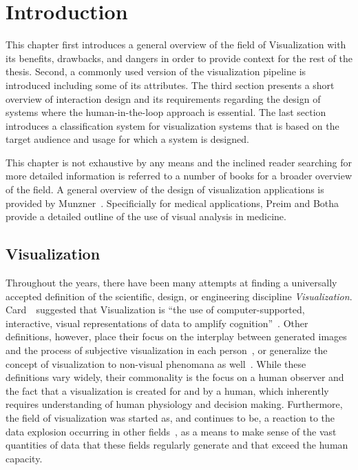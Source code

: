 \chapter{Introduction} \label{cha:intro}
This chapter first introduces a general overview of the field of Visualization with its benefits, drawbacks, and dangers in order to provide context for the rest of the thesis.  Second, a commonly used version of the visualization pipeline is introduced including some of its attributes.  The third section presents a short overview of interaction design and its requirements regarding the design of systems where the human-in-the-loop approach is essential.  The last section introduces a classification system for visualization systems that is based on the target audience and usage for which a system is designed.

This chapter is not exhaustive by any means and the inclined reader searching for more detailed information is referred to a number of books for a broader overview of the field.  A general overview of the design of visualization applications is provided by Munzner~\cite{munzner2014visualization}.  Specificially for medical applications, Preim and Botha~\cite{preim2013visual} provide a detailed outline of the use of visual analysis in medicine.

\section{Visualization} \label{cha:intro:vis}
Throughout the years, there have been many attempts at finding a universally accepted definition of the scientific, design, or engineering discipline \emph{Visualization}.  Card~\etal~suggested that Visualization is ``the use of computer-supported, interactive, visual representations of data to amplify cognition''~\cite{card1999readings}.  Other definitions, however, place their focus on the interplay between generated images and the process of subjective visualization in each person~\cite{van2006views}, or generalize the concept of visualization to non-visual phenomana as well~\cite{ronnberg2016interactive}.  While these definitions vary widely, their commonality is the focus on a human observer and the fact that a visualization is created for and by a human, which inherently requires understanding of human physiology and decision making.  Furthermore, the field of visualization was started as, and continues to be, a reaction to the data explosion occurring in other fields~\cite{lorensen2004death}, as a means to make sense of the vast quantities of data that these fields regularly generate and that exceed the human capacity.

